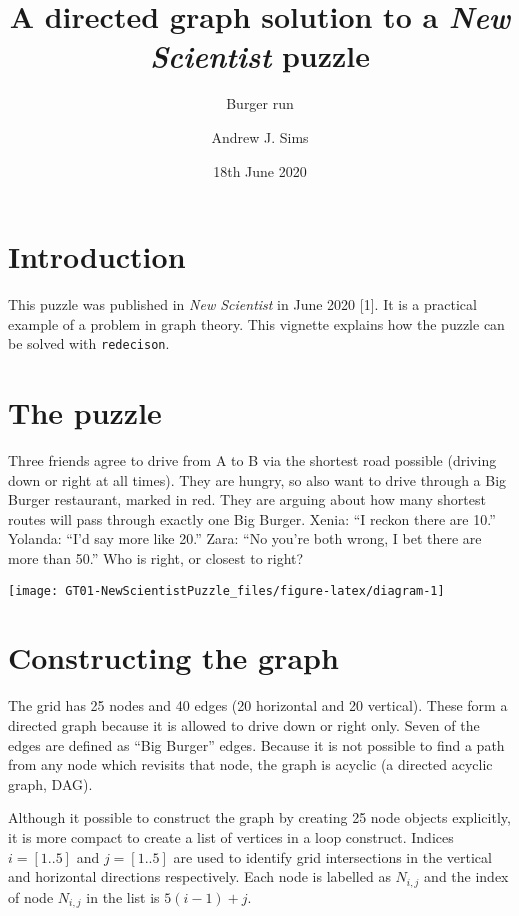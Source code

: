 \documentclass[
]{article}
\title{A directed graph solution to a \emph{New Scientist} puzzle}
\subtitle{Burger run}
\author{Andrew J. Sims}
\date{18th June 2020}
\begin{document}
\maketitle

\hypertarget{introduction}{%
\section{Introduction}\label{introduction}}

This puzzle was published in \emph{New Scientist} in June 2020 {[}1{]}.
It is a practical example of a problem in graph theory. This vignette
explains how the puzzle can be solved with \texttt{redecison}.

\hypertarget{the-puzzle}{%
\section{The puzzle}\label{the-puzzle}}

Three friends agree to drive from A to B via the shortest road possible
(driving down or right at all times). They are hungry, so also want to
drive through a Big Burger restaurant, marked in red. They are arguing
about how many shortest routes will pass through exactly one Big Burger.
Xenia: ``I reckon there are 10.'' Yolanda: ``I'd say more like 20.''
Zara: ``No you're both wrong, I bet there are more than 50.'' Who is
right, or closest to right?

\begin{center}\texttt{[image: GT01-NewScientistPuzzle\_files/figure-latex/diagram-1]} \end{center}

\hypertarget{constructing-the-graph}{%
\section{Constructing the graph}\label{constructing-the-graph}}

The grid has 25 nodes and 40 edges (20 horizontal and 20 vertical).
These form a directed graph because it is allowed to drive down or right
only. Seven of the edges are defined as ``Big Burger'' edges. Because it
is not possible to find a path from any node which revisits that node,
the graph is acyclic (a directed acyclic graph, DAG).

Although it possible to construct the graph by creating 25 node objects
explicitly, it is more compact to create a list of vertices in a loop
construct. Indices \(i = [1 .. 5]\) and \(j = [1 .. 5]\) are used to
identify grid intersections in the vertical and horizontal directions
respectively. Each node is labelled as \(N_{i,j}\) and the index of node
\(N_{i,j}\) in the list is \(5(i-1)+j\).
\end{document}
